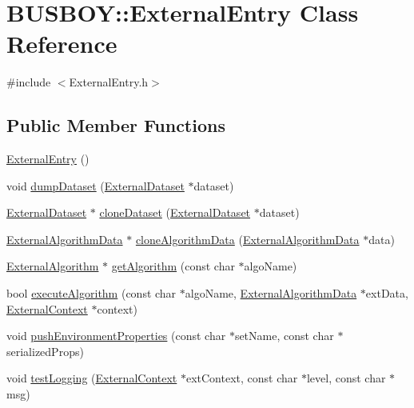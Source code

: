 \hypertarget{classBUSBOY_1_1ExternalEntry}{
\section{BUSBOY::ExternalEntry Class Reference}
\label{classBUSBOY_1_1ExternalEntry}
}


{\ttfamily \#include $<$ExternalEntry.h$>$}\subsection*{Public Member Functions}
\begin{DoxyCompactItemize}
\item 
\hyperlink{classBUSBOY_1_1ExternalEntry_a3b077bb1c81479d3211f3c1872837114}{ExternalEntry} ()
\item 
void \hyperlink{classBUSBOY_1_1ExternalEntry_a96e304914f39c07ea58b7c534bff1920}{dumpDataset} (\hyperlink{classBUSBOY_1_1ExternalDataset}{ExternalDataset} $\ast$dataset)
\item 
\hyperlink{classBUSBOY_1_1ExternalDataset}{ExternalDataset} $\ast$ \hyperlink{classBUSBOY_1_1ExternalEntry_adee2166838562c387c1e215771ac917b}{cloneDataset} (\hyperlink{classBUSBOY_1_1ExternalDataset}{ExternalDataset} $\ast$dataset)
\item 
\hyperlink{classBUSBOY_1_1ExternalAlgorithmData}{ExternalAlgorithmData} $\ast$ \hyperlink{classBUSBOY_1_1ExternalEntry_af82edeccb112045ee6e28fe1e29df19b}{cloneAlgorithmData} (\hyperlink{classBUSBOY_1_1ExternalAlgorithmData}{ExternalAlgorithmData} $\ast$data)
\item 
\hyperlink{classBUSBOY_1_1ExternalAlgorithm}{ExternalAlgorithm} $\ast$ \hyperlink{classBUSBOY_1_1ExternalEntry_a5fd7376ad89521b4de73a4c70fc6b2b2}{getAlgorithm} (const char $\ast$algoName)
\item 
bool \hyperlink{classBUSBOY_1_1ExternalEntry_a39907b7f41c1d742dc78e62e2f28918b}{executeAlgorithm} (const char $\ast$algoName, \hyperlink{classBUSBOY_1_1ExternalAlgorithmData}{ExternalAlgorithmData} $\ast$extData, \hyperlink{classBUSBOY_1_1ExternalContext}{ExternalContext} $\ast$context)
\item 
void \hyperlink{classBUSBOY_1_1ExternalEntry_a08262dbdeff6bce6cb0ad568d1a1a395}{pushEnvironmentProperties} (const char $\ast$setName, const char $\ast$serializedProps)
\item 
void \hyperlink{classBUSBOY_1_1ExternalEntry_afcf5fbab9fe9bce1513f90e53ddecbeb}{testLogging} (\hyperlink{classBUSBOY_1_1ExternalContext}{ExternalContext} $\ast$extContext, const char $\ast$level, const char $\ast$msg)

\end{DoxyCompactItemize}
